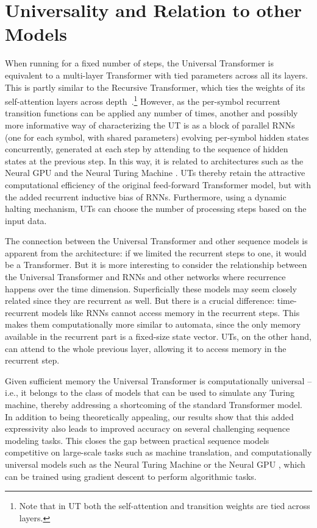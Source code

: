 \section{Universality and Relation to other Models}
\label{sec:related}
When running for a fixed number of steps, the Universal Transformer is equivalent to a multi-layer Transformer with tied parameters across all its layers. This is partly similar to the Recursive Transformer, which ties the weights of its self-attention layers across depth~\citep{gulcehre2018hyperbolic}.\footnote{Note that in UT both the self-attention and transition weights are tied across layers.} However, as the per-symbol recurrent transition functions can be applied any number of times, another and possibly more informative way of characterizing the UT is as a block of parallel RNNs (one for each symbol, with shared parameters) evolving per-symbol hidden states concurrently, generated at each step by attending to the sequence of hidden states at the previous step. In this way, it is related to architectures such as the Neural GPU \citep{neural_gpu} and the Neural Turing Machine \citep{ntm14}. UTs thereby retain the attractive computational efficiency of the original feed-forward Transformer model, but with the added recurrent inductive bias of RNNs. Furthermore, using a dynamic halting mechanism, UTs can choose the number of processing steps based on the input data. %

The connection between the Universal Transformer and other sequence models is apparent from the architecture: if we limited the recurrent steps to one, it would be a Transformer. But it is more interesting to consider the relationship between the Universal Transformer and RNNs and other networks where recurrence happens over the time dimension. Superficially these models may seem closely related since they are recurrent as well. But there is a crucial difference: time-recurrent models like RNNs cannot access memory in the recurrent steps. This makes them computationally more similar to automata, since the only memory available in the recurrent part is a fixed-size state vector. UTs, on the other hand, can attend to the whole previous layer, allowing it to access memory in the recurrent step. 

Given sufficient memory the Universal Transformer is computationally universal -- i.e., it belongs to the class of models that can be used to simulate any Turing machine, thereby addressing a shortcoming of the standard Transformer model. In addition to being theoretically appealing, our results show that this added expressivity also leads to improved accuracy on several challenging sequence modeling tasks. This closes the gap between practical sequence models competitive on large-scale tasks such as machine translation, and computationally universal models such as the Neural Turing Machine or the Neural GPU \citep{ntm14,neural_gpu}, which can be trained using gradient descent to perform algorithmic tasks.

